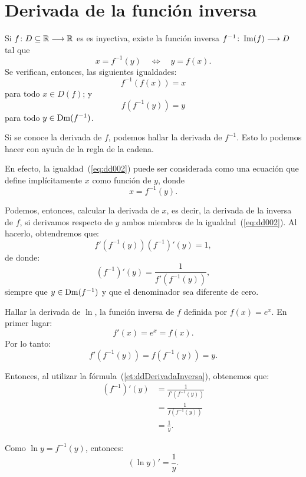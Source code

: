 \section{Derivada de la función inversa}
Si $f\colon D\subseteq\mathbb{R}\longrightarrow \mathbb{R}$ es es inyectiva, existe la función inversa
$f^{-1}\colon \operatorname{Im}(f)\longrightarrow D$ tal que
\begin{equation*}
	x=f^{-1}(y) \quad \Leftrightarrow \quad y=f(x).
\end{equation*}
Se verifican, entonces, las siguientes igualdades:
\begin{equation*}
	f^{-1}(f(x))=x
\end{equation*}
para todo $x\in D(f)$; y
\begin{equation}
\label{eq:dd002}
f(f^{-1}(y))=y
\end{equation}
para todo $y\in \operatorname{Dm}(f^{-1})$.

Si se conoce la derivada de $f$, podemos hallar la derivada de $f^{-1}$. Esto lo podemos hacer con
ayuda de la regla de la cadena.

En efecto, la igualdad~(\ref{eq:dd002}) puede ser considerada como una ecuación que define
implícitamente $x$ como función de $y$, donde
\[
x = f^{-1}(y).
\]

Podemos, entonces, calcular la derivada de $x$, es decir, la derivada de la inversa de $f$, si
derivamos respecto de $y$ ambos miembros de la igualdad~(\ref{eq:dd002}). Al hacerlo, obtendremos
que:
\[
f'(f^{-1}(y))(f^{-1})'(y) = 1,
\]
de donde:
\begin{equation}
\label{et:ddDerivadaInversa}
	(f^{-1})'(y)= \frac{1}{f'(f^{-1}(y))},
\end{equation}
siempre que $y\in \operatorname{Dm}(f^{-1})$ y que el denominador sea diferente de cero.

\begin{exemplo}[Solución]{%
Hallar la derivada de $\ln$, la función inversa de $f$ definida por $f(x) = e^x$.
}%
En primer lugar:
\[
f'(x) = e^x = f(x).
\]
Por lo tanto:
\[
f'(f^{-1}(y)) = f(f^{-1}(y)) = y.
\]

Entonces, al utilizar la fórmula~(\ref{et:ddDerivadaInversa}), obtenemos que:
\begin{align*}
(f^{-1})'(y) &= \frac{1}{f'(f^{-1}(y))} \\[4pt]
   &= \frac{1}{f(f^{-1}(y))} \\[4pt]
   &= \frac{1}{y}.
\end{align*}

Como $\ln y = f^{-1}(y)$, entonces:
\[
(\ln y)' = \frac{1}{y}.
\]
\end{exemplo}

